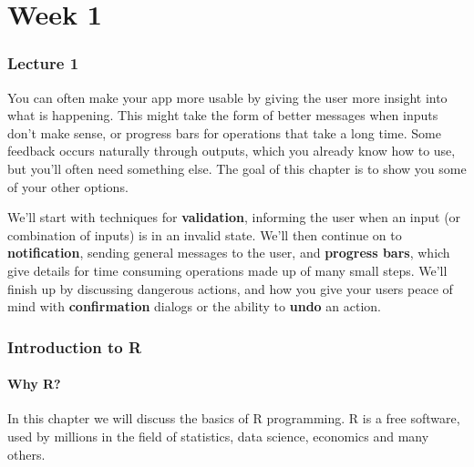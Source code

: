 \documentclass[
]{article}
\begin{document}
\hypertarget{part-week-1}{%
\part*{Week 1}\label{part-week-1}}

\hypertarget{lecture1}{%
\section{Lecture 1}\label{lecture1}}

You can often make your app more usable by giving the user more insight into what is happening.
This might take the form of better messages when inputs don't make sense, or progress bars for operations that take a long time.
Some feedback occurs naturally through outputs, which you already know how to use, but you'll often need something else.
The goal of this chapter is to show you some of your other options.

We'll start with techniques for \textbf{validation}, informing the user when an input (or combination of inputs) is in an invalid state.
We'll then continue on to \textbf{notification}, sending general messages to the user, and \textbf{progress bars}, which give details for time consuming operations made up of many small steps.
We'll finish up by discussing dangerous actions, and how you give your users peace of mind with \textbf{confirmation} dialogs or the ability to \textbf{undo} an action.

\hypertarget{seminar1}{%
\section{Introduction to R}\label{seminar1}}

\hypertarget{why-r}{%
\subsection{Why R?}\label{why-r}}

In this chapter we will discuss the basics of R programming.
R is a free software, used by millions in the field of statistics, data science, economics and many others.
\end{document}
